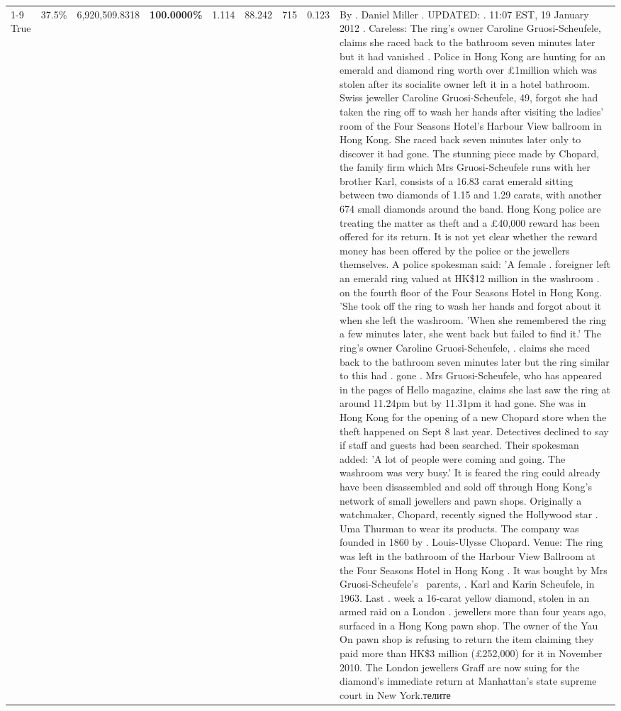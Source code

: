 \begin{table}[H]
\begin{tabular}{lllrlllll}
\cline{1-9} \cline{2-9}
True & 37.5\% & 6,920,509.8318 & \bfseries \color{red} 100.0000\% & 1.114 & 88.242 & 715 & 0.123 & By . Daniel Miller . UPDATED: . 11:07 EST, 19 January 2012 . Careless: The ring's owner Caroline Gruosi-Scheufele, claims she raced back to the bathroom seven minutes later but it had vanished . Police in Hong Kong are hunting for an emerald and diamond ring worth over £1million which was stolen after its socialite owner left it in a hotel bathroom. Swiss jeweller Caroline Gruosi-Scheufele, 49, forgot she had taken the ring off to wash her hands after visiting the ladies' room of the Four Seasons Hotel's Harbour View ballroom in Hong Kong. She raced back seven minutes later only to discover it had gone. The stunning piece made by Chopard, the family firm which Mrs Gruosi-Scheufele runs with her brother Karl, consists of a 16.83 carat emerald sitting between two diamonds of 1.15 and 1.29 carats, with another 674 small diamonds around the band. Hong Kong police are treating the matter as theft and a £40,000 reward has been offered for its return. It is not yet clear whether the reward money has been offered by the police or the jewellers themselves. A police spokesman said: 'A female . foreigner left an emerald ring valued at HK\$12 million in the washroom . on the fourth floor of the Four Seasons Hotel in Hong Kong. 'She took off the ring to wash her hands and forgot about it when she left the washroom. 'When she remembered the ring a few minutes later, she went back but failed to find it.' The ring's owner Caroline Gruosi-Scheufele, . claims she raced back to the bathroom seven minutes later but the ring similar to this had . gone . Mrs Gruosi-Scheufele, who has appeared in the pages of Hello magazine, claims she last saw the ring at around 11.24pm but by 11.31pm it had gone. She was in Hong Kong for the opening of a new Chopard store when the theft happened on Sept 8 last year. Detectives declined to say if staff and guests had been searched. Their spokesman added: 'A lot of people were coming and going. The washroom was very busy.' It is feared the ring could already have been disassembled and sold off through Hong Kong's network of small jewellers and pawn shops. Originally a watchmaker, Chopard, recently signed the Hollywood star . Uma Thurman to wear its products. The company was founded in 1860 by . Louis-Ulysse Chopard. Venue: The ring was left in the bathroom of the Harbour View Ballroom at the Four Seasons Hotel in Hong Kong . It was bought by Mrs Gruosi-Scheufele's  parents, . Karl and Karin Scheufele, in 1963. Last . week a 16-carat yellow diamond, stolen in an armed raid on a London . jewellers more than four years ago, surfaced in a Hong Kong pawn shop. The owner of the Yau On pawn shop is refusing to return the item claiming they paid more than HK\$3 million (£252,000) for it in November 2010. The London jewellers Graff are now suing for the diamond’s immediate return at Manhattan’s state supreme court in New York.телите \\

\end{tabular}
\end{table}
